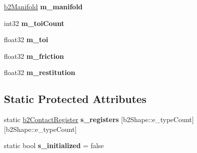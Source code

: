 \begin{DoxyCompactItemize}
\item 
\hypertarget{classb2_contact_aebdc2c073d05ac8e544a591d2043b251}{\hyperlink{structb2_manifold}{b2\-Manifold} {\bfseries m\-\_\-manifold}}\label{classb2_contact_aebdc2c073d05ac8e544a591d2043b251}

\item 
\hypertarget{classb2_contact_afaa231f3e9a908154f9a32af456601b6}{int32 {\bfseries m\-\_\-toi\-Count}}\label{classb2_contact_afaa231f3e9a908154f9a32af456601b6}

\item 
\hypertarget{classb2_contact_aa9e75253eaac6efdb6485a8646ac553f}{float32 {\bfseries m\-\_\-toi}}\label{classb2_contact_aa9e75253eaac6efdb6485a8646ac553f}

\item 
\hypertarget{classb2_contact_ac7915ef6f92d609ee0a43d518b4f9e75}{float32 {\bfseries m\-\_\-friction}}\label{classb2_contact_ac7915ef6f92d609ee0a43d518b4f9e75}

\item 
\hypertarget{classb2_contact_a6bc56522b4c04e28bee3542a7fc2f796}{float32 {\bfseries m\-\_\-restitution}}\label{classb2_contact_a6bc56522b4c04e28bee3542a7fc2f796}

\end{DoxyCompactItemize}
\subsection*{Static Protected Attributes}
\begin{DoxyCompactItemize}
\item 
\hypertarget{classb2_contact_a5e2beb4e435e1545ae043a7a2b77d1da}{static \hyperlink{structb2_contact_register}{b2\-Contact\-Register} {\bfseries s\-\_\-registers} \mbox{[}b2\-Shape\-::e\-\_\-type\-Count\mbox{]}\mbox{[}b2\-Shape\-::e\-\_\-type\-Count\mbox{]}}\label{classb2_contact_a5e2beb4e435e1545ae043a7a2b77d1da}

\item 
\hypertarget{classb2_contact_a672598c350694d7b9a89c45f8ad0dd90}{static bool {\bfseries s\-\_\-initialized} = false}\label{classb2_contact_a672598c350694d7b9a89c45f8ad0dd90}

\end{DoxyCompactItemize}
